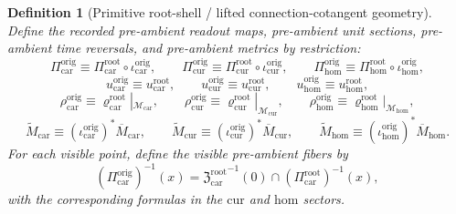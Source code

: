 \documentclass[11pt]{article}
\newcommand{\TensorOriginSpace}{\mathcal M_{\mathrm{car}}}
\newcommand{\CurOriginSpace}{\mathcal M_{\mathrm{cur}}}
\newcommand{\HomOriginSpace}{\mathcal M_{\mathrm{hom}}}
\newcommand{\TensorOriginRead}{\Pi_{\mathrm{car}}^{\mathrm{orig}}}
\newcommand{\CurOriginRead}{\Pi_{\mathrm{cur}}^{\mathrm{orig}}}
\newcommand{\HomOriginRead}{\Pi_{\mathrm{hom}}^{\mathrm{orig}}}
\newcommand{\TensorOriginUnit}{u_{\mathrm{car}}^{\mathrm{orig}}}
\newcommand{\CurOriginUnit}{u_{\mathrm{cur}}^{\mathrm{orig}}}
\newcommand{\HomOriginUnit}{u_{\mathrm{hom}}^{\mathrm{orig}}}
\newcommand{\TensorOriginTimeRev}{\rho_{\mathrm{car}}^{\mathrm{orig}}}
\newcommand{\CurOriginTimeRev}{\rho_{\mathrm{cur}}^{\mathrm{orig}}}
\newcommand{\HomOriginTimeRev}{\rho_{\mathrm{hom}}^{\mathrm{orig}}}
\newcommand{\TensorOriginSpaceMetric}{\widetilde M_{\mathrm{car}}}
\newcommand{\CurOriginSpaceMetric}{\widetilde M_{\mathrm{cur}}}
\newcommand{\HomOriginSpaceMetric}{\widetilde M_{\mathrm{hom}}}
\newcommand{\TensorRootRead}{\Pi_{\mathrm{car}}^{\mathrm{root}}}
\newcommand{\CurRootRead}{\Pi_{\mathrm{cur}}^{\mathrm{root}}}
\newcommand{\HomRootRead}{\Pi_{\mathrm{hom}}^{\mathrm{root}}}
\newcommand{\TensorRootUnit}{u_{\mathrm{car}}^{\mathrm{root}}}
\newcommand{\CurRootUnit}{u_{\mathrm{cur}}^{\mathrm{root}}}
\newcommand{\HomRootUnit}{u_{\mathrm{hom}}^{\mathrm{root}}}
\newcommand{\TensorRootTimeRev}{\varrho_{\mathrm{car}}^{\mathrm{root}}}
\newcommand{\CurRootTimeRev}{\varrho_{\mathrm{cur}}^{\mathrm{root}}}
\newcommand{\HomRootTimeRev}{\varrho_{\mathrm{hom}}^{\mathrm{root}}}
\newcommand{\TensorRootSpaceMetric}{\overline M_{\mathrm{car}}}
\newcommand{\CurRootSpaceMetric}{\overline M_{\mathrm{cur}}}
\newcommand{\HomRootSpaceMetric}{\overline M_{\mathrm{hom}}}
\newcommand{\TensorRootSection}{\mathfrak Z_{\mathrm{car}}^{\mathrm{root}}}
\newcommand{\TensorOriginInc}{\iota_{\mathrm{car}}^{\mathrm{orig}}}
\newcommand{\CurOriginInc}{\iota_{\mathrm{cur}}^{\mathrm{orig}}}
\newcommand{\HomOriginInc}{\iota_{\mathrm{hom}}^{\mathrm{orig}}}
\newtheorem{definition}{Definition}
\begin{document}
\begin{definition}[Primitive root-shell / lifted connection-cotangent geometry]
Define the recorded pre-ambient readout maps, pre-ambient unit sections, pre-ambient time reversals, and pre-ambient metrics by restriction:
\begin{equation}
\TensorOriginRead\equiv\TensorRootRead\circ\TensorOriginInc,\qquad
\CurOriginRead\equiv\CurRootRead\circ\CurOriginInc,\qquad
\HomOriginRead\equiv\HomRootRead\circ\HomOriginInc,
\label{eq:origin_read_from_root}
\end{equation}
\begin{equation}
\TensorOriginUnit\equiv\TensorRootUnit,\qquad
\CurOriginUnit\equiv\CurRootUnit,\qquad
\HomOriginUnit\equiv\HomRootUnit,
\label{eq:origin_unit_from_root}
\end{equation}
\begin{equation}
\TensorOriginTimeRev\equiv\TensorRootTimeRev|_{\TensorOriginSpace},\qquad
\CurOriginTimeRev\equiv\CurRootTimeRev|_{\CurOriginSpace},\qquad
\HomOriginTimeRev\equiv\HomRootTimeRev|_{\HomOriginSpace},
\label{eq:origin_time_rev_from_root}
\end{equation}
\begin{equation}
\TensorOriginSpaceMetric\equiv(\TensorOriginInc)^*\TensorRootSpaceMetric,\qquad
\CurOriginSpaceMetric\equiv(\CurOriginInc)^*\CurRootSpaceMetric,\qquad
\HomOriginSpaceMetric\equiv(\HomOriginInc)^*\HomRootSpaceMetric.
\label{eq:origin_metric_from_root}
\end{equation}
For each visible point, define the visible pre-ambient fibers by
\begin{equation}
(\TensorOriginRead)^{-1}(x)
=
{\TensorRootSection}^{-1}(0)\cap(\TensorRootRead)^{-1}(x),
\label{eq:origin_fiber_from_root_car}
\end{equation}
with the corresponding formulas in the \(\mathrm{cur}\) and \(\mathrm{hom}\) sectors.
\end{definition}
\end{document}
